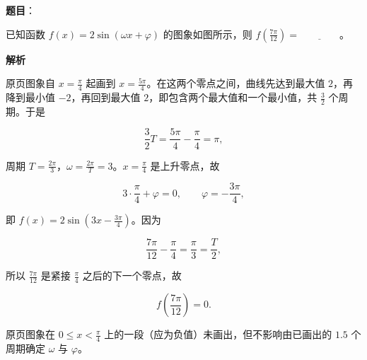 \begin{answer}

\textbf{题目}：

已知函数 $f(x)=2\sin(\omega x+\varphi)$ 的图象如图所示，则 $f\left(\frac{7\pi}{12}\right)=$$\underline{\qquad\qquad}$。
\nopagebreak[4]
\begin{center}\end{center}
\nopagebreak[4]
\textbf{解析}

原页图象自 $x=\frac{\pi}{4}$ 起画到 $x=\frac{5\pi}{4}$。在这两个零点之间，曲线先达到最大值 $2$，再降到最小值 $-2$，再回到最大值 $2$，即包含两个最大值和一个最小值，共 $\frac32$ 个周期。于是

\nopagebreak[4]
\[\frac32T=\frac{5\pi}{4}-\frac{\pi}{4}=\pi,\]

周期 $T=\frac{2\pi}{3}$，$\omega=\frac{2\pi}{T}=3$。$x=\frac{\pi}{4}$ 是上升零点，故

\nopagebreak[4]
\[3\cdot\frac{\pi}{4}+\varphi=0,\qquad \varphi=-\frac{3\pi}{4},\]

即 $f(x)=2\sin\left(3x-\frac{3\pi}{4}\right)$。因为

\nopagebreak[4]
\[\frac{7\pi}{12}-\frac{\pi}{4}=\frac{\pi}{3}=\frac T2,\]

所以 $\frac{7\pi}{12}$ 是紧接 $\frac{\pi}{4}$ 之后的下一个零点，故

\nopagebreak[4]
\[f\left(\frac{7\pi}{12}\right)=0 .\]

原页图象在 $0\leqslant x<\frac{\pi}{4}$ 上的一段（应为负值）未画出，但不影响由已画出的 $1.5$ 个周期确定 $\omega$ 与 $\varphi$。


\end{answer}
